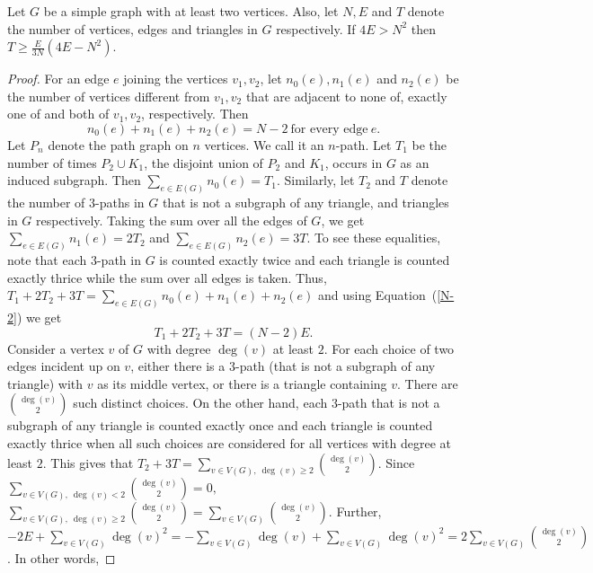 \documentclass[10pt,a4paper]{amsart}
\begin{document}
  \begin{lemma}
  	Let $G$ be a simple graph with at least two vertices. Also, let $N, E$ and $T$ denote the number of vertices, edges and triangles in $G$ respectively. If $4E > N^2$ then $T \geq \frac{E}{3N} (4E -N^2)$.
  	\label{Nograph-k5-key}
  \end{lemma}

  \begin{proof}
For an edge $e$ joining the vertices $v_1, v_2$, let $n_0 (e), n_1 (e)$ and $n_2 (e) $ be the number of vertices different from $v_1, v_2$ that are adjacent to none of, exactly one of and both of $v_1, v_2$, respectively. Then  \begin{equation}
	n_0 (e)+ n_1 (e)+n_2 (e) =N-2  ~\mbox{for every edge}~ e.
	\label{N-2}
\end{equation}
 Let $P_n$ denote the path  graph on $n$ vertices. We call it  an $n$-path. Let $T_1$ be the number of times  $P_2 \cup K_1 $, the disjoint union of $P_2$ and $K_1$,  occurs in $G$ as an induced subgraph. Then $\sum_{e \in E(G)} n_0 (e)=T_1$.
 Similarly, let $T_2$ and $T $ denote the number of $3$-paths in $G$ that is not a subgraph of any triangle, and triangles in $G$ respectively.  Taking the sum over all the edges of $G$, we get  $\sum_{e \in E(G)}n_1 (e) =2 T_2$ and  $\sum_{e \in E(G)}n_2 (e) = 3T$.  To see these equalities, note that each $3$-path in $G$ is counted exactly twice and each triangle is counted exactly thrice while the sum over all edges is taken. Thus, $ T_1 +2 T_2+3T  = \sum_{e \in E(G)}n_0 (e) + n_1 (e)+ n_2 (e)$ and using Equation~(\ref{N-2}) we get 
 \begin{equation}
T_1 + 2 T_2 +3 T  =(N-2)E.
\label{T1T2T3} 
\end{equation} 
Consider a vertex $v$ of $G$ with degree $\deg(v)$ at least $2$. For each choice of two edges incident up on $v$,   either there is a $3$-path (that is not a subgraph of any triangle) with $v$ as its  middle vertex, or there is a triangle containing $v$. There are $\binom{\deg(v)}{2}$ such distinct choices.  On the other hand, each $3$-path that is not a subgraph of any triangle is counted exactly once and each triangle is counted exactly thrice when all such choices are considered for all vertices with degree at least $2$. This gives that $	T_2 +3 T =\sum_{v \in V(G), ~\deg(v) \geq 2} \binom{\deg(v)}{2}.$    Since $ \sum_{v \in V(G), ~\deg(v) < 2} \binom{\deg(v)}{2}=0, $  $ \sum_{v \in V(G), ~\deg(v) \geq 2} \binom{\deg(v)}{2}= \sum_{v\in V(G)} \binom{\deg(v)}{2}$. Further, $-2E + \sum_{v\in V(G)}  \deg(v)^2 =-\sum_{v\in V(G)} \deg(v) + \sum_{v\in V(G)}  \deg(v)^2 = 2 \sum_{v\in V(G)}  \binom{\deg(v)}{2}$. In other words, 

\end{proof}
\end{document}
